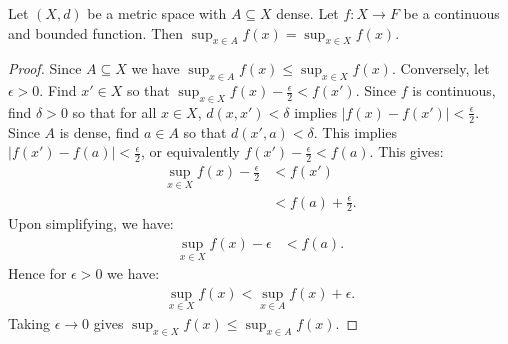     \begin{proposition}
        Let $(X,d)$ be a metric space with $A \subseteq X$ dense. Let $f:X \rightarrow F$ be a continuous and bounded function. Then $\sup_{x \in A}f(x) = \sup_{x \in X}f(x)$.
    \end{proposition}
        \begin{proof}
            Since $A \subseteq X$ we have $\sup_{x \in A}f(x) \leq \sup_{x \in X}f(x)$. Conversely, let $\epsilon > 0$. Find $x' \in X$ so that $\sup_{x \in X}f(x) - \frac{\epsilon}{2} < f(x')$. Since $f$ is continuous, find $\delta > 0$ so that for all $x \in X$, $d(x,x') < \delta$ implies $|f(x)-f(x')| < \frac{\epsilon}{2}$. Since $A$ is dense, find $a \in A$ so that $d(x',a) < \delta$. This implies $|f(x')-f(a)| < \frac{\epsilon}{2}$, or equivalently $f(x')- \frac{\epsilon}{2} < f(a)$. This gives:
                \begin{equation*}
                \begin{split}
                    \sup_{x \in X}f(x) - \frac{\epsilon}{2}
                    & < f(x') \\
                    & <f(a) + \frac{\epsilon}{2}.
                \end{split}
                \end{equation*}
            Upon simplifying, we have:
                \begin{equation*}
                \begin{split}
                    \sup_{x \in X}f(x) - \epsilon 
                    & < f(a).
                \end{split}
                \end{equation*}
            Hence for $\epsilon > 0$ we have:
                \begin{equation*}
                \begin{split}
                    \sup_{x \in X}f(x)< \sup_{x \in A}f(x) + \epsilon.
                \end{split}
                \end{equation*}
            Taking $\epsilon \rightarrow 0$ gives $\sup_{x \in X}f(x) \leq \sup_{x \in A}f(x)$.
        \end{proof}

